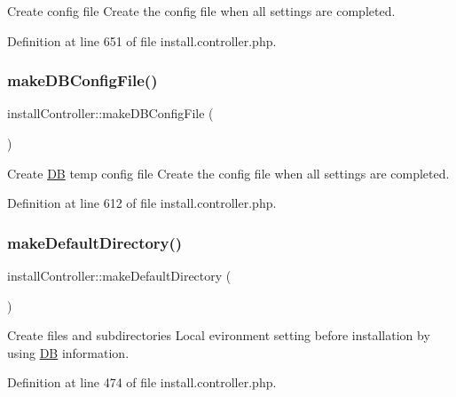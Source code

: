 Create config file Create the config file when all settings are completed. 



Definition at line 651 of file install.\+controller.\+php.

\mbox{\label{classinstallController_a65277eeb03f9762ae58dab7570e5310c}} 
\subsubsection{\texorpdfstring{make\+D\+B\+Config\+File()}{makeDBConfigFile()}}
{\footnotesize\ttfamily install\+Controller\+::make\+D\+B\+Config\+File (\begin{DoxyParamCaption}{ }\end{DoxyParamCaption})}



Create \hyperlink{classDB}{DB} temp config file Create the config file when all settings are completed. 



Definition at line 612 of file install.\+controller.\+php.

\mbox{\label{classinstallController_a5503f7ef0615cbd6b11a6ef4ae13c2c9}} 
\subsubsection{\texorpdfstring{make\+Default\+Directory()}{makeDefaultDirectory()}}
{\footnotesize\ttfamily install\+Controller\+::make\+Default\+Directory (\begin{DoxyParamCaption}{ }\end{DoxyParamCaption})}



Create files and subdirectories Local evironment setting before installation by using \hyperlink{classDB}{DB} information. 



Definition at line 474 of file install.\+controller.\+php.

